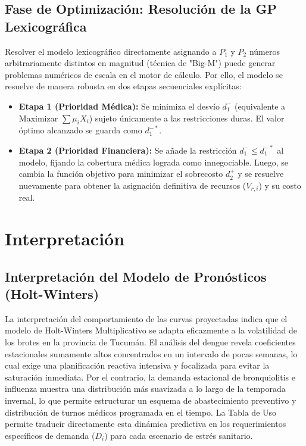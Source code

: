 \documentclass[conference]{IEEEtran}
\begin{document}
\subsection{Fase de Optimización: Resolución de la GP Lexicográfica}
Resolver el modelo lexicográfico directamente asignando a $P_1$ y $P_2$ números arbitrariamente distintos en magnitud (técnica de "Big-M") puede generar problemas numéricos de escala en el motor de cálculo. Por ello, el modelo se resuelve de manera robusta en dos etapas secuenciales explícitas:
\begin{itemize}
    \item \textbf{Etapa 1 (Prioridad Médica):} Se minimiza el desvío $d_1^-$ (equivalente a Maximizar $\sum \mu_i X_i$) sujeto únicamente a las restricciones duras. El valor óptimo alcanzado se guarda como $d_1^{-*}$.
    \item \textbf{Etapa 2 (Prioridad Financiera):} Se añade la restricción $d_1^- \le d_1^{-*}$ al modelo, fijando la cobertura médica lograda como innegociable. Luego, se cambia la función objetivo para minimizar el sobrecosto $d_2^+$ y se resuelve nuevamente para obtener la asignación definitiva de recursos ($V_{r,i}$) y su costo real.
\end{itemize}

\section{Interpretación}

\subsection{Interpretación del Modelo de Pronósticos (Holt-Winters)}
La interpretación del comportamiento de las curvas proyectadas indica que el modelo de Holt-Winters Multiplicativo se adapta eficazmente a la volatilidad de los brotes en la provincia de Tucumán. El análisis del dengue revela coeficientes estacionales sumamente altos concentrados en un intervalo de pocas semanas, lo cual exige una planificación reactiva intensiva y focalizada para evitar la saturación inmediata. Por el contrario, la demanda estacional de bronquiolitis e influenza muestra una distribución más suavizada a lo largo de la temporada invernal, lo que permite estructurar un esquema de abastecimiento preventivo y distribución de turnos médicos programada en el tiempo. La Tabla de Uso permite traducir directamente esta dinámica predictiva en los requerimientos específicos de demanda ($D_i$) para cada escenario de estrés sanitario.
\end{document}

